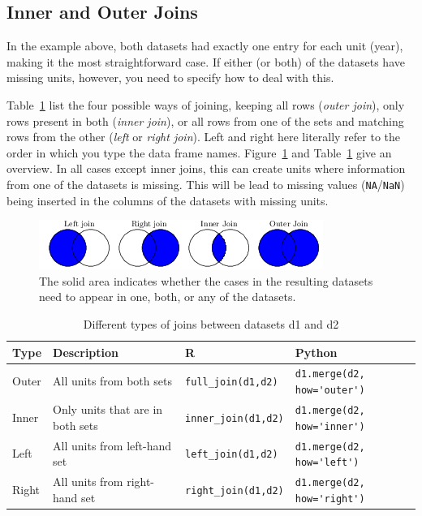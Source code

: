 \subsection{Inner and Outer Joins}

In the example above, both datasets had exactly one entry for each unit (year), making it the most straightforward case.
If either (or both) of the datasets have missing units, however, you need to specify how to deal with this.

Table~\ref{tab:joins} list the four possible ways of joining, keeping all rows (\emph{outer join}), only rows present in both (\emph{inner join}), or all rows from one of the sets and matching rows from the other (\emph{left} or \emph{right join}). Left and right here literally refer to the order in which you type the data frame names. Figure~\ref{fig:joinvenn} and Table~\ref{tab:joins} give an overview.
In all cases except inner joins, this can create units where information from one of the datasets is missing.
This will be lead to missing values (\verb|NA|/\verb|NaN|) being inserted in the columns of the datasets with missing units.

\begin{figure}
    \centering
    \includegraphics{figures/ch07_figjoins.png}
    \caption{The solid area indicates whether the cases in the resulting datasets need to appear in one, both, or any of the datasets.}
    \label{fig:joinvenn}
\end{figure}

\begin{table}
  \caption{\label{tab:joins}Different types of joins between datasets d1 and d2}{
  \begin{tabularx}{\linewidth}{lXll}
    \toprule
    Type &  Description  & R & Python \\
    \midrule
    Outer &  All units from both sets & \verb|full_join(d1,d2)| & \verb|d1.merge(d2, how='outer')| \\
    Inner & Only units that are in both sets & \verb|inner_join(d1,d2)| & \verb|d1.merge(d2, how='inner')| \\
    Left & All units from left-hand set & \verb|left_join(d1,d2)| & \verb|d1.merge(d2, how='left')| \\
    Right & All units from right-hand set & \verb|right_join(d1,d2)| & \verb|d1.merge(d2, how='right')| \\
    \bottomrule
  \end{tabularx}}{}
\end{table}


